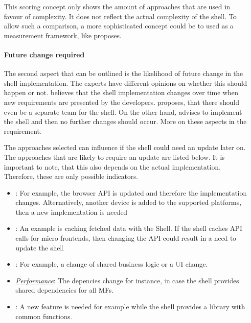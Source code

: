 This scoring concept only shows the amount of approaches that are used in favour of complexity.
It does not reflect the actual complexity of the shell.
To allow such a comparison, a more sophisticated concept could be to used as a measurement framework, like \textcite{Briand.1996} proposes.



\paragraph{Future change required}

The second aspect that can be outlined is the likelihood of future change in the shell implementation.
The experts have different opinions on whether this should happen or not.
\textciteRehm{} believes that the shell implementation changes over time when new requirements are presented by the developers.
\textciteSteyer{} proposes, that there should even be a separate team for the shell.
On the other hand, \textcite{Laug.2018} advises to implement the shell and then no further changes should occur.
More on these aspects in the \textit{} requirement.

The approaches selected can influence if the shell could need an update later on.
The approaches that are likely to require an update are listed below.
It is important to note, that this also depends on the actual implementation.
Therefore, these are only possible indicators.

\begin{itemize}

      \item \textit{}: For example, the browser \ac{API} is updated and therefore the implementation changes. Alternatively, another device is added to the supported platforms, then a new implementation is needed

      \item \textit{}: An example is caching fetched data with the Shell. If the shell caches \ac{API} calls for micro frontends, then changing the \ac{API} could result in a need to update the shell

      \item \textit{}: For example, a change of shared business logic or a \ac{UI} change.

      \item \textit{\hyperref[cha:requirement_detail_performance]{Performance}}: The depencies change for instance, in case the shell provides shared dependencies for all \acp{MF}.

      \item \textit{}: A new feature is needed for example while the shell provides a library with common functions.

\end{itemize}





